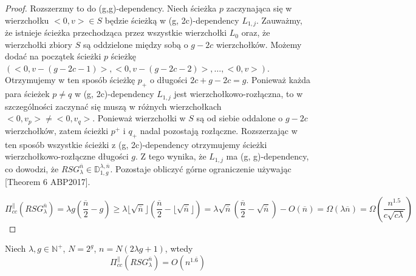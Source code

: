 \begin{proof}
	Rozszerzmy to do (g,g)-dependency.
	Niech ścieżka $p$ zaczynająca się w wierzchołku $<0, v> \in S$ będzie ścieżką w (g, 2c)-dependency $L_{1,j}$. Zauważmy, że istnieje ścieżka przechodząca przez wszystkie wierzchołki $L_{0}$ oraz, że wierzchołki zbiory $S$ są oddzielone między sobą o $g - 2c$ wierzchołków.
	Możemy dodać na początek ścieżki $p$ ścieżkę $( <0, v - (g - 2c - 1)>, <0, v - (g - 2c -2)>, \dots, <0, v>)$.
	Otrzymujemy w ten sposób ścieżkę $p_{+}$ o długości $2c + g - 2c = g$.
	Ponieważ każda para ścieżek $p \neq q$ w (g, 2c)-dependency $L_{1,j}$ jest wierzchołkowo-rozłączna,
	to w szczególności zaczynać się muszą w różnych wierzchołkach $<0, v_{p}> \neq <0, v_{q}>$.
	Ponieważ wierzchołki w $S$ są od siebie oddalone o $g - 2c$ wierzchołków, zatem ścieżki $p^{+}$ i $q_{+}$ nadal pozostają rozłączne.
	Rozszerzając w ten sposób wszystkie ścieżki z (g, 2c)-dependency otrzymujemy ścieżki wierzchołkowo-rozłączne długości $g$. Z tego wynika, że $L_{1,j}$ ma (g, g)-dependency, co dowodzi, że $ RSG_{\lambda}^{ \overline{n}} \in \mathbb{D}_{1,g}^{\lambda, \overline{n}} $.
	Pozostaje obliczyć górne ograniczenie używając [Theorem 6 ABP2017].
	
	$$ \Pi_{cc}^{ \parallel }(RSG_{\lambda}^{\overline{n}}) = \lambda g \left( \frac{ \overline{n}}{2} - g \right) \geq \lambda \lfloor \sqrt{ \overline{n}} \rfloor \left( \frac{ \overline{n}}{2} - \lfloor \sqrt{ \overline{n}} \rfloor \right) = \lambda \sqrt{ \overline{n}} \left( \frac{ \overline{n}}{2} - \sqrt{ \overline{n}} \right) - O(\overline{n}) =  \Omega \left( \lambda \overline{n} \right) = \Omega \left( \frac{n^{1.5}}{c \sqrt{c \lambda}} \right) $$
	
\end{proof}



\begin{theorem}
	Niech $\lambda, g \in \mathbb{N}^{+}$, $N = 2^{g}$, $n = N(2 \lambda g + 1)$, wtedy
	$$ \Pi_{cc}^{ \parallel }(RSG_{\lambda}^{\overline{n}}) = O \left( n^{1.\overline{6}} \right) $$
\end{theorem}


